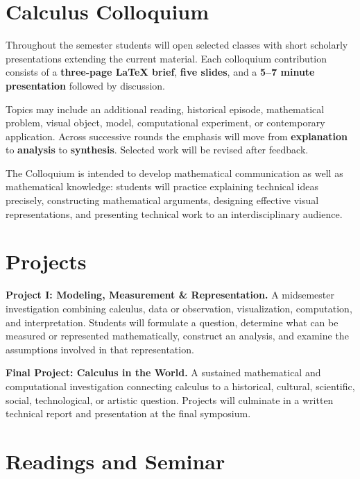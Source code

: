 \documentclass[11pt]{article}
\begin{document}
\section{Calculus Colloquium}

Throughout the semester students will open selected classes with short
scholarly presentations extending the current material. Each colloquium
contribution consists of a \textbf{three-page LaTeX brief},
\textbf{five slides}, and a \textbf{5--7 minute presentation} followed
by discussion.

Topics may include an additional reading, historical episode,
mathematical problem, visual object, model, computational experiment,
or contemporary application. Across successive rounds the emphasis
will move from \textbf{explanation} to \textbf{analysis} to
\textbf{synthesis}. Selected work will be revised after feedback.

The Colloquium is intended to develop mathematical communication as
well as mathematical knowledge: students will practice explaining
technical ideas precisely, constructing mathematical arguments,
designing effective visual representations, and presenting technical
work to an interdisciplinary audience.


\section{Projects}

\textbf{Project I: Modeling, Measurement \& Representation.}
A midsemester investigation combining calculus, data or observation,
visualization, computation, and interpretation. Students will formulate
a question, determine what can be measured or represented
mathematically, construct an analysis, and examine the assumptions
involved in that representation.

\medskip

\textbf{Final Project: Calculus in the World.}
A sustained mathematical and computational investigation connecting
calculus to a historical, cultural, scientific, social, technological,
or artistic question. Projects will culminate in a written technical
report and presentation at the final symposium.


\section{Readings and Seminar}
\end{document}
